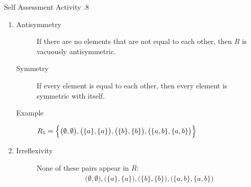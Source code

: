\documentclass[../notes.tex]{subfiles}
\begin{document}
\begin{exercise}{Self Assessment Activity \thechapter.8}
\begin{enumerate}
\begin{enumerate}[label=(\alph*)]
								\item {}
									\begin{description}
										\item[Antisymmetry] If there are no elements that are not equal to each other, then $R$ is vacuously antisymmetric.
										\item[Symmetry] If every element is equal to each other, then every element is symmetric with itself.
										\item[Example] $
											\begin{aligned}[t]
												R_{5} &= \Bigl\{\bigl(\emptyset, \emptyset\bigr), \bigl(\{a\}, \{a\}\bigr), \bigl(\{b\}, \{b\}\bigr), \bigl(\{a, b\}, \{a, b\}\bigr)\Bigr\}
											\end{aligned}  $
									\end{description}
								\item {}
									\begin{description}
										\item[Irreflexivity] None of these pairs appear in $R$:
											\begin{align*}
												\bigl(\emptyset, \emptyset\bigr), \bigl(\{a\}, \{a\}\bigr), \bigl(\{b\}, \{b\}\bigr), \bigl(\{a, b\}, \{a, b\}\bigr)

\end{align*}
\end{description}
\end{enumerate}
\end{enumerate}
\end{exercise}
\end{document}
